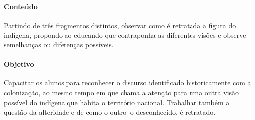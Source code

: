 \documentclass{extarticle}
\begin{document}
\paragraph{Conteúdo}  
Partindo de três fragmentos distintos, observar como é retratada a
figura do indígena, propondo ao educando que contraponha as diferentes
visões e observe semelhanças ou diferenças possíveis.

\paragraph{Objetivo}
Capacitar os alunos para reconhecer o discurso identificado
historicamente com a colonização, ao mesmo tempo em que chama a
atenção para uma outra visão possível do indígena que habita o
território nacional. Trabalhar também a questão da alteridade e de
como o outro, o desconhecido, é retratado.
\end{document}
